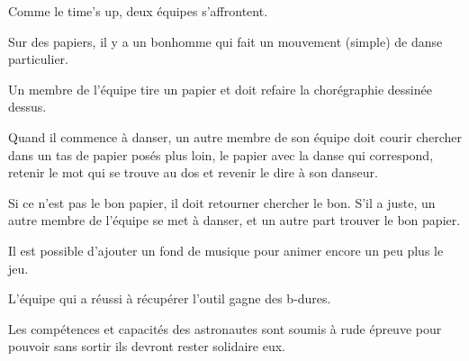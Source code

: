 \documentclass{grand-jeu}
\begin{document}
\begin{liste-materiel}
\end{liste-materiel}

\begin{regles}
Comme le time’s up, deux équipes s'affrontent.

Sur des papiers, il y a un bonhomme qui fait un mouvement (simple) de danse particulier.

Un membre de l’équipe tire un papier et doit refaire la chorégraphie dessinée dessus.

Quand il commence à danser, un autre membre de son équipe doit courir chercher dans un tas de papier posés plus loin, le papier avec la danse qui correspond, retenir le mot qui se trouve au dos et revenir le dire à son danseur.

Si ce n’est pas le bon papier, il doit retourner chercher le bon. S’il a juste, un autre membre de l’équipe se met à danser, et un autre part trouver le bon papier.

Il est possible d’ajouter un fond de musique pour animer encore un peu plus le jeu.

L’équipe qui a réussi à récupérer l’outil gagne des b-dures.
\end{regles}

\begin{imaginaire}
Les compétences et capacités des astronautes sont soumis à rude épreuve pour pouvoir sans sortir ils devront rester solidaire eux.
\end{imaginaire}

\begin{moments-stop}
\end{moments-stop}
\end{document}
